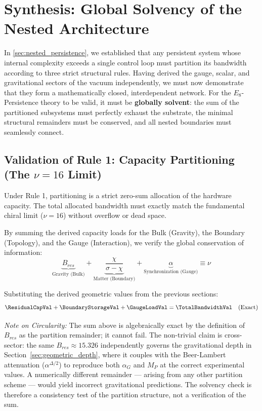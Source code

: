 
\section{Synthesis: Global Solvency of the Nested Architecture}
\label{sec:Synthesis}

In \cref{sec:nested_persistence}, we established that any persistent system whose internal complexity exceeds a single control loop must partition its bandwidth according to three strict structural rules. Having derived the gauge, scalar, and gravitational sectors of the vacuum independently, we must now demonstrate that they form a mathematically closed, interdependent network. For the $E_8$-Persistence theory to be valid, it must be \textbf{globally solvent}: the sum of the partitioned subsystems must perfectly exhaust the substrate, the minimal structural remainders must be conserved, and all nested boundaries must seamlessly connect.

\subsection{Validation of Rule 1: Capacity Partitioning (The \texorpdfstring{$\nu=16$}{nu=16} Limit)}
Under Rule 1, partitioning is a strict zero-sum allocation of the hardware capacity. The total allocated bandwidth must exactly match the fundamental chiral limit ($\nu = 16$) without overflow or dead space. 

By summing the derived capacity loads for the Bulk (Gravity), the Boundary (Topology), and the Gauge (Interaction), we verify the global conservation of information:
\begin{equation}
\underbrace{B_{res}}_{\text{Gravity (Bulk)}} + \underbrace{\frac{\chi}{\sigma-\chi}}_{\text{Matter (Boundary)}} + \underbrace{\alpha}_{\text{Synchronization (Gauge)}} \equiv \nu
\end{equation}

Substituting the derived geometric values from the previous sections:
\begin{equation}
\ResidualCapVal + \BoundaryStorageVal + \GaugeLoadVal = \TotalBandwidthVal \quad (\text{Exact})
\end{equation}

\textit{Note on Circularity:} The sum above is algebraically exact by the definition of $B_{res}$ as the partition remainder; it cannot fail. The non-trivial claim is cross-sector: the same $B_{res} \approx 15.326$ independently governs the gravitational depth in Section~\ref{sec:geometric_depth}, where it couples with the Beer-Lambert attenuation ($\alpha^{\Delta/2}$) to reproduce both $\alpha_G$ and $M_P$ at the correct experimental values. A numerically different remainder --- arising from any other partition scheme --- would yield incorrect gravitational predictions. The solvency check is therefore a consistency test of the partition structure, not a verification of the sum.

